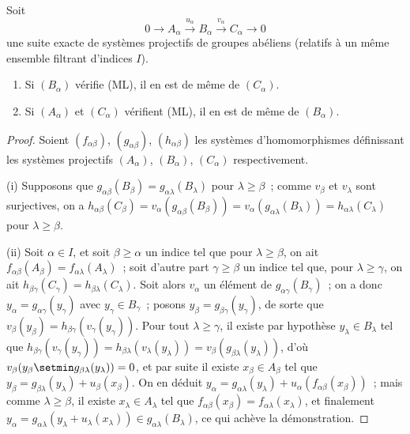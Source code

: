 \begin{proposition}[13.2.1]
\label{0.13.2.1-fr}
Soit
\[
0\longrightarrow A_\alpha\xrightarrow{u_\alpha}B_\alpha
\xrightarrow{v_\alpha}C_\alpha\longrightarrow0
\]
une suite exacte de systèmes projectifs de groupes abéliens (relatifs
à un même ensemble filtrant d'indices $I$).
\begin{enumerate}
\item[\emph{(i)}]
Si $(B_\alpha)$ vérifie \textup{(ML)}, il en est de même de $(C_\alpha)$.
\item[\emph{(ii)}]
Si $(A_\alpha)$ et $(C_\alpha)$ vérifient \textup{(ML)}, il en est de même de
$(B_\alpha)$.
\end{enumerate}
\end{proposition}

\begin{proof}
Soient $(f_{\alpha\beta})$, $(g_{\alpha\beta})$, $(h_{\alpha\beta})$ les
systèmes d'homomorphismes définissant les systèmes projectifs
$(A_\alpha)$, $(B_\alpha)$, $(C_\alpha)$ respectivement.

(i) Supposons que
$g_{\alpha\beta}(B_\beta)=g_{\alpha\lambda}(B_\lambda)$ pour
$\lambda\geq\beta$~; comme $v_\beta$ et $v_\lambda$ sont surjectives, on a
$h_{\alpha\beta}(C_\beta)=v_\alpha(g_{\alpha\beta}(B_\beta))=v_\alpha(g_{\alpha\lambda}(B_\lambda))=h_{\alpha\lambda}(C_\lambda)$
pour $\lambda\geq\beta$.

(ii) Soit $\alpha\in I$, et soit $\beta\geq\alpha$ un indice tel que pour
$\lambda\geq\beta$, on ait
$f_{\alpha\beta}(A_\beta)=f_{\alpha\lambda}(A_\lambda)$~; soit d'autre
part $\gamma\geq\beta$ un indice tel que, pour $\lambda\geq\gamma$, on ait
$h_{\beta\gamma}(C_\gamma)=h_{\beta\lambda}(C_\lambda)$. Soit alors
$v_\alpha$ un élément de $g_{\alpha\gamma}(B_\gamma)$~; on a donc
$y_\alpha=g_{\alpha\gamma}(y_\gamma)$ avec $y_\gamma\in B_\gamma$~;
posons $y_\beta=g_{\beta\gamma}(y_\gamma)$, de sorte que
$v_\beta(y_\beta)=h_{\beta\gamma}(v_\gamma(y_\gamma))$. Pour tout
$\lambda\geq\gamma$, il existe par hypothèse $y_\lambda\in B_\lambda$ tel
que
$h_{\beta\gamma}(v_\gamma(y_\gamma))
=h_{\beta\lambda}(v_\lambda(y_\lambda))
=v_\beta(g_{\beta\lambda}(y_\lambda))$, d'où
$v_\beta(y_\beta\setmin g_{\beta\lambda}(y_\lambda))=0$, et par suite il existe
$x_\beta\in A_\beta$
tel que
$y_\beta=g_{\beta\lambda}(y_\lambda)+u_\beta(x_\beta)$. On en déduit
$y_\alpha=g_{\alpha\lambda}(y_\lambda)+u_\alpha(f_{\alpha\beta}(x_\beta))$~;
mais comme $\lambda\geq\beta$, il existe $x_\lambda\in A_\lambda$ tel que
$f_{\alpha\beta}(x_\beta)=f_{\alpha\lambda}(x_\lambda)$, et finalement
$y_\alpha=g_{\alpha\lambda}(y_\lambda+u_\lambda(x_\lambda))\in g_{\alpha\lambda}(B_\lambda)$,
ce qui achève la démonstration.
\end{proof}

